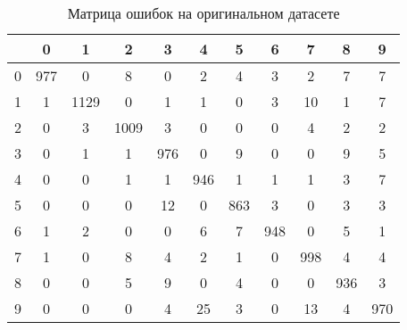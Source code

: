 \documentclass{article}
\begin{document}
\begin{table}[t]
    \caption{\label{table:confusion_matrix_vanilla} Матрица ошибок на оригинальном датасете}
    \begin{center}
        \begin{tabular}{|c|c|c|c|c|c|c|c|c|c|c|}
            \hline
              &   0 &    1 &    2 &   3 &   4 &   5 &   6 &   7 &   8 &   9 \\ \hline
            0 & 977 &    0 &    8 &   0 &   2 &   4 &   3 &   2 &   7 &   7 \\ \hline
            1 &   1 & 1129 &    0 &   1 &   1 &   0 &   3 &  10 &   1 &   7 \\ \hline
            2 &   0 &    3 & 1009 &   3 &   0 &   0 &   0 &   4 &   2 &   2 \\ \hline
            3 &   0 &    1 &    1 & 976 &   0 &   9 &   0 &   0 &   9 &   5 \\ \hline
            4 &   0 &    0 &    1 &   1 & 946 &   1 &   1 &   1 &   3 &   7 \\ \hline
            5 &   0 &    0 &    0 &  12 &   0 & 863 &   3 &   0 &   3 &   3 \\ \hline
            6 &   1 &    2 &    0 &   0 &   6 &   7 & 948 &   0 &   5 &   1 \\ \hline
            7 &   1 &    0 &    8 &   4 &   2 &   1 &   0 & 998 &   4 &   4 \\ \hline
            8 &   0 &    0 &    5 &   9 &   0 &   4 &   0 &   0 & 936 &   3 \\ \hline
            9 &   0 &    0 &    0 &   4 &  25 &   3 &   0 &  13 &   4 & 970 \\ \hline
        \end{tabular}
    \end{center}
\end{table} 
\end{document}
